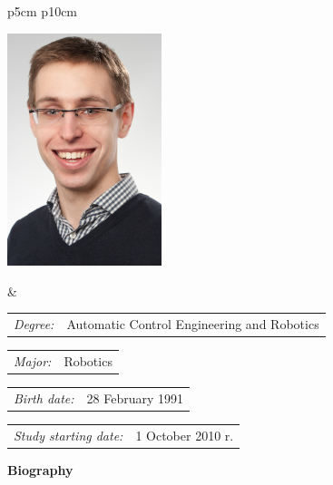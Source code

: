 \documentclass[12pt]{report}
\begin{document}
  
  \vspace*{1\baselineskip}
    \begin{tabular}{p{5cm} p{10cm}}
    \begin{minipage}{5cm}
    \center
    \includegraphics[width=4.5cm]{figs/ja}
    \end{minipage}
    &
    \begin{minipage}{12cm}
\par\noindent\vspace{1\baselineskip}
    \begin{flushleft}
    \par\noindent\vspace{1\baselineskip}
    \begin{tabular}[h]{l l}
    {\normalsize\it Degree:} & Automatic Control Engineering and Robotics
    \end{tabular}
    \par\noindent\vspace{1\baselineskip}
    \begin{tabular}[h]{l l}
    {\normalsize\it Major:} & Robotics
    \end{tabular}
    \par\noindent\vspace{1\baselineskip}
    \begin{tabular}[h]{l l}
    {\normalsize\it Birth date:} & {\normalsize 28 February 1991}
    \end{tabular}
    \par\noindent\vspace{1\baselineskip}
    \begin{tabular}[h]{l l}
    {\normalsize\it Study starting date:} & {\normalsize 1 October 2010 r.}
    \end{tabular}
    \par\noindent\vspace{1\baselineskip}
    \end{flushleft}
    \end{minipage}
    \end{tabular}
    \vspace*{1\baselineskip}
    \begin{center}
	{\large\bfseries Biography}\par\bigskip
    \end{center}
	
\end{document}
